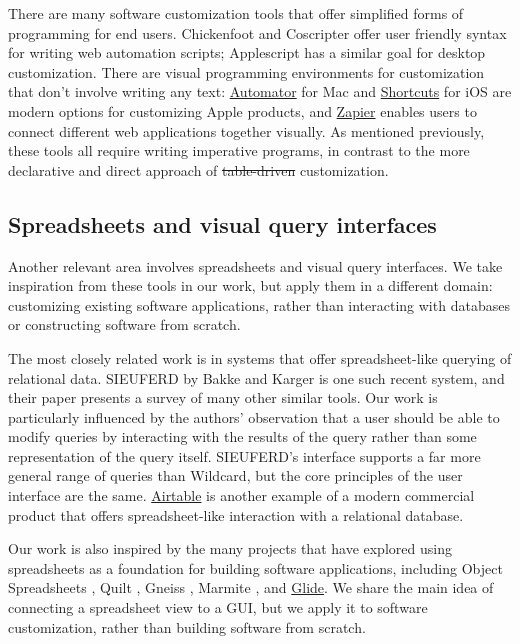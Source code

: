 \documentclass[sigplan,screen,10pt,anonymous,review]{acmart}
\providecommand{\DIFadd}[1]{{\protect\color{blue}\uwave{#1}}} %
\providecommand{\DIFdel}[1]{{\protect\color{red}\sout{#1}}}                      %
\providecommand{\DIFaddbegin}{} %
\providecommand{\DIFaddend}{} %
\providecommand{\DIFdelbegin}{} %
\providecommand{\DIFdelend}{} %
\begin{document}
There are many software customization tools that offer simplified forms
of programming for end users. Chickenfoot \citep{bolin2005} and
Coscripter \citep{leshed2008} offer user friendly syntax for writing web
automation scripts; Applescript \citep{cook2007} has a similar goal for
desktop customization. There are visual programming environments for
customization that don't involve writing any text:
\href{https://support.apple.com/guide/automator/welcome/mac}{Automator}
for Mac and
\href{https://apps.apple.com/us/app/shortcuts/id915249334}{Shortcuts}
for iOS are modern options for customizing Apple products, and
\href{https://zapier.com/}{Zapier} enables users to connect different
web applications together visually. As mentioned previously, these tools
all require writing imperative programs, in contrast to the more
declarative and direct approach of \DIFdelbegin \DIFdel{table-driven }\DIFdelend \DIFaddbegin \DIFadd{data-driven }\DIFaddend customization.

\hypertarget{spreadsheets-and-visual-query-interfaces}{%
\subsection{Spreadsheets and visual query
interfaces}\label{spreadsheets-and-visual-query-interfaces}}

Another relevant area involves spreadsheets and visual query interfaces.
We take inspiration from these tools in our work, but apply them in a
different domain: customizing existing software applications, rather
than interacting with databases or constructing software from scratch.

The most closely related work is in systems that offer spreadsheet-like
querying of relational data. SIEUFERD by Bakke and Karger
\citep{bakke2016} is one such recent system, and their paper presents a
survey of many other similar tools. Our work is particularly influenced
by the authors' observation that a user should be able to modify queries
by interacting with the results of the query rather than some
representation of the query itself. SIEUFERD's interface supports a far
more general range of queries than Wildcard, but the core principles of
the user interface are the same. \href{https://airtable.com/}{Airtable}
is another example of a modern commercial product that offers
spreadsheet-like interaction with a relational database.

Our work is also inspired by the many projects that have explored using
spreadsheets as a foundation for building software applications,
including Object Spreadsheets \citep{mccutchen2016}, Quilt
\citep{benson2014}, Gneiss \citep{chang2014}, Marmite \citep{wong2007},
and \href{https://www.glideapps.com/}{Glide}. We share the main idea of
connecting a spreadsheet view to a GUI, but we apply it to software
customization, rather than building software from scratch.
\end{document}
